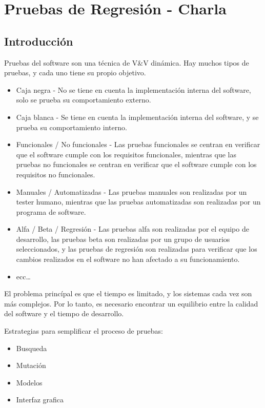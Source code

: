 \chapter{Pruebas de Regresión - Charla}

\section{Introducción}

Pruebas del software son una técnica de V\&V dinámica. Hay muchos tipos de pruebas, y cada uno tiene su propio objetivo.

\begin{itemize}
   \item Caja negra - No se tiene en cuenta la implementación interna del software, solo se prueba su comportamiento externo.
   \item Caja blanca - Se tiene en cuenta la implementación interna del software, y se prueba su comportamiento interno.
   \item Funcionales / No funcionales - Las pruebas funcionales se centran en verificar que el software cumple con los requisitos funcionales, mientras que las pruebas no funcionales se centran en verificar que el software cumple con los requisitos no funcionales.
   \item Manuales / Automatizadas - Las pruebas manuales son realizadas por un tester humano, mientras que las pruebas automatizadas son realizadas por un programa de software.
   \item Alfa / Beta / Regresión - Las pruebas alfa son realizadas por el equipo de desarrollo, las pruebas beta son realizadas por un grupo de usuarios seleccionados, y las pruebas de regresión son realizadas para verificar que los cambios realizados en el software no han afectado a su funcionamiento.
   \item ecc\dots
\end{itemize}

El problema princípal es que el tiempo es limitado, y los sistemas cada vez son más complejos. Por lo tanto, es necesario encontrar un equilibrio entre la calidad del software y el tiempo de desarrollo.


Estrategias para semplificar el proceso de pruebas:
\begin{itemize}
	\item Busqueda 
	\item Mutación
	\item Modelos 
	\item Interfaz grafica
\end{itemize}

